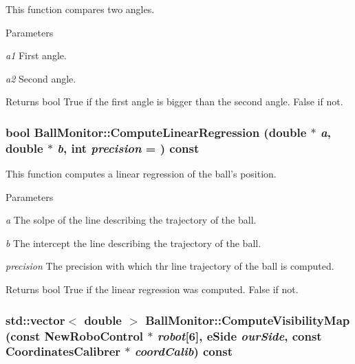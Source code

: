 This function compares two angles. 


\begin{DoxyParams}{Parameters}
\item[{\em a1}]First angle. \item[{\em a2}]Second angle. \end{DoxyParams}
\begin{DoxyReturn}{Returns}
bool True if the first angle is bigger than the second angle. False if not. 
\end{DoxyReturn}
\hypertarget{classBallMonitor_a49645db55ca752adbc2a5a074c7314be}{
\subsubsection[{ComputeLinearRegression}]{\setlength{\rightskip}{0pt plus 5cm}bool BallMonitor::ComputeLinearRegression (double $\ast$ {\em a}, \/  double $\ast$ {\em b}, \/  int {\em precision} = {}) const}}
\label{classBallMonitor_a49645db55ca752adbc2a5a074c7314be}


This function computes a linear regression of the ball's position. 


\begin{DoxyParams}{Parameters}
\item[{\em a}]The solpe of the line describing the trajectory of the ball. \item[{\em b}]The intercept the line describing the trajectory of the ball. \item[{\em precision}]The precision with which thr line trajectory of the ball is computed. \end{DoxyParams}
\begin{DoxyReturn}{Returns}
bool True if the linear regression was computed. False if not. 
\end{DoxyReturn}
\hypertarget{classBallMonitor_ac30119e22cfe4814670c4eae8c6b5495}{
\subsubsection[{ComputeVisibilityMap}]{\setlength{\rightskip}{0pt plus 5cm}std::vector$<$ double $>$ BallMonitor::ComputeVisibilityMap (const {\bf NewRoboControl} $\ast$ {\em robot}\mbox{[}6\mbox{]}, \/  eSide {\em ourSide}, \/  const {\bf CoordinatesCalibrer} $\ast$ {\em coordCalib}) const}}
\label{classBallMonitor_ac30119e22cfe4814670c4eae8c6b5495}


